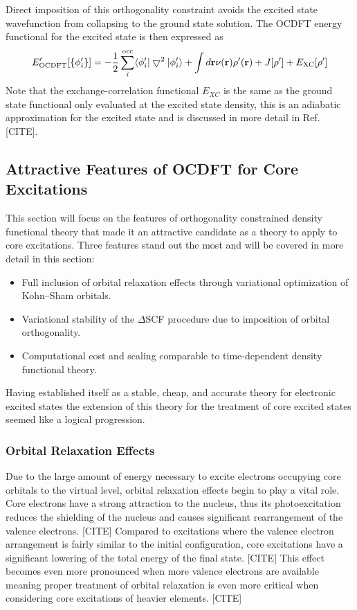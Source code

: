 \documentclass[final]{emory}
\begin{document}
Direct imposition of this orthogonality constraint avoids the excited state wavefunction from collapsing to the ground state solution. The OCDFT energy functional for the excited state is then expressed as
\begin{equation}
E^{\prime}_{\rm OCDFT}[\{\phi^{\prime}_i\}] = - \frac{1}{2} \sum^{\rm occ}_i \langle \phi^{\prime}_i| \bigtriangledown^2 | \phi^{\prime}_i \rangle + \int d\mathbf{r} \nu(\mathbf{r}) \rho^{\prime}(\mathbf{r}) + J[\rho^{\prime}] + E_{\rm XC}[\rho^{\prime}]
\end{equation}
Note that the exchange-correlation functional $E_{XC}$ is the same as the ground state functional only evaluated at the excited state density, this is an adiabatic approximation for the excited state and is discussed in more detail in Ref. [CITE]. 
\subsection{Attractive Features of OCDFT for Core Excitations}
This section will focus on the features of orthogonality constrained density functional theory that made it an attractive candidate as a theory to apply to core excitations. Three features stand out the most and will be covered in more detail in this section:
\begin{itemize}
\item Full inclusion of orbital relaxation effects through variational optimization of Kohn--Sham orbitals.
\item Variational stability of the $\Delta$SCF procedure due to imposition of orbital orthogonality.
\item Computational cost and scaling comparable to time-dependent density functional theory.
\end{itemize}
Having established itself as a stable, cheap, and accurate theory for electronic excited states the extension of this theory for the treatment of core excited states seemed like a logical progression.
\subsubsection{Orbital Relaxation Effects}
Due to the large amount of energy necessary to excite electrons occupying core orbitals to the virtual level, orbital relaxation effects begin to play a vital role. Core electrons have a strong attraction to the nucleus, thus its photoexcitation reduces the shielding of the nucleus and  causes significant rearrangement of the valence electrons. [CITE] Compared to excitations where the valence electron arrangement is fairly similar to the initial configuration, core excitations have a significant lowering of the total energy of the final state. [CITE] This effect becomes even more pronounced when more valence electrons are available meaning proper treatment of orbital relaxation is even more critical when considering core excitations of heavier elements. [CITE] 
\end{document}
